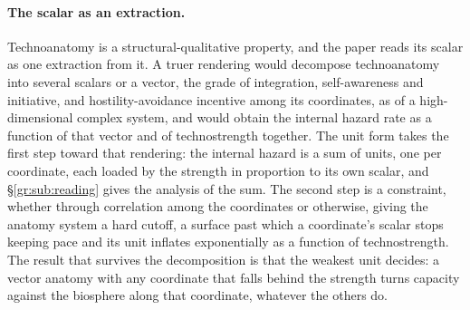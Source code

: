 \begin{definition}
\paragraph{The scalar as an extraction.} Technoanatomy is a structural-qualitative property, and the paper reads its scalar as one extraction from it. A truer rendering would decompose technoanatomy into several scalars or a vector, the grade of integration, self-awareness and initiative, and hostility-avoidance incentive among its coordinates, as of a high-dimensional complex system, and would obtain the internal hazard rate as a function of that vector and of technostrength together. The unit form takes the first step toward that rendering: the internal hazard is a sum of units, one per coordinate, each loaded by the strength in proportion to its own scalar, and \S\ref{gr:sub:reading} gives the analysis of the sum. The second step is a constraint, whether through correlation among the coordinates or otherwise, giving the anatomy system a hard cutoff, a surface past which a coordinate's scalar stops keeping pace and its unit inflates exponentially as a function of technostrength. The result that survives the decomposition is that the weakest unit decides: a vector anatomy with any coordinate that falls behind the strength turns capacity against the biosphere along that coordinate, whatever the others do.

\end{definition}
